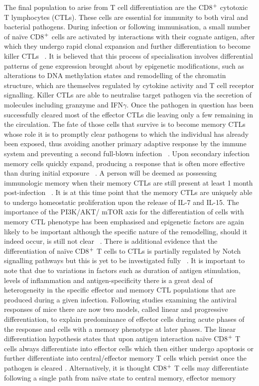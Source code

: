 The final population to arise from T cell differentiation are the CD8$\textsuperscript{+}$ cytotoxic T lymphocytes (CTLs). These cells are essential for immunity to both viral and bacterial pathogens. During infection or following immunisation, a small number of na\"ive CD8$\textsuperscript{+}$ cells are activated by interactions with their cognate antigen, after which they undergo rapid clonal expansion and further differentiation to become killer CTLs ~\autocite{Gra2014,Roy2015}. It is believed that this process of specialisation involves differential patterns of gene expression brought about by epigenetic modifications, such as alterations to DNA methylation states and remodelling of the chromatin structure, which are themselves regulated by cytokine activity and T cell receptor signalling. Killer CTLs are able to neutralise target pathogen via the secretion of molecules including granzyme and IFN$\gamma$. Once the pathogen in question has been successfully cleared most of the effector CTLs die leaving only a few remaining in the circulation. The fate of those cells that survive is to become memory CTLs whose role it is to promptly clear pathogens to which the individual has already been exposed, thus avoiding another primary adaptive response by the immune system and preventing a second full-blown infection ~\autocite{Roy2015}. Upon secondary infection memory cells quickly expand, producing a response that is often more effective than during initial exposure ~\autocite{Roy2015}. A person will be deemed as possessing immunologic memory when their memory CTLs are still present at least 1 month post-infection ~\autocite{Gra2014}. It is at this time point that the memory CTLs are uniquely able to undergo homeostatic proliferation upon the release of IL-7 and IL-15.  The importance of the PI3K/AKT/ mTOR axis for the differentiation of cells with memory CTL phenotype has been emphasised and epigenetic factors are again likely to be important although the specific nature of the remodelling, should it indeed occur, is still not clear ~\autocite{Gra2014,Edw2014}. There is additional evidence that the differentiation of na\"ive CD8$\textsuperscript{+}$ T cells to CTLs is partially regulated by Notch signalling pathways but this is yet to be investigated fully ~\autocite{Koya2012}. It is important to note that due to variations in factors such as duration of antigen stimulation, levels of inflammation and antigen-specificity there is a great deal of heterogeneity in the specific effector and memory CTL populations that are produced during a given infection. Following studies examining the antiviral responses of mice there are now two models, called linear and progressive differentiation, to explain predominance of effector cells during acute phases of the response and cells with a memory phenotype at later phases. The linear differentiation hypothesis states that upon antigen interaction na\"ive CD8$\textsuperscript{+}$ T cells always differentiate into effector cells which then either undergo apoptosis or further differentiate into central/effector memory T cells which persist once the pathogen is cleared \autocite{Roy2015}. Alternatively, it is thought CD8$\textsuperscript{+}$ T cells may differentiate following a single path from na\"ive state to central memory, effector memory 
